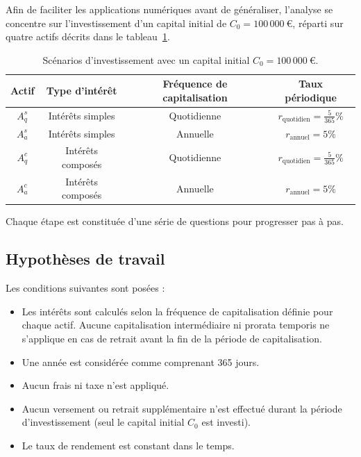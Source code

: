 \documentclass{article}
\begin{document}
Afin de faciliter les applications numériques avant de généraliser, l'analyse se concentre sur l'investissement d'un capital initial de \( C_0 = 100\,000\ \text{€} \), réparti sur quatre actifs décrits dans le tableau~\ref{tab:scenarios}.

\begin{table}[h!]
    \centering
    \begin{tabular}{|c|c|c|c|}
        \hline
        \textbf{Actif} & \textbf{Type d'intérêt} & \textbf{Fréquence de capitalisation} & \textbf{Taux périodique}                \\
        \hline
        \(A_q^s\)      & Intérêts simples        & Quotidienne                           & \(r_\text{quotidien} = \frac{5}{365}\%\) \\
        \hline
        \(A_a^s\)      & Intérêts simples        & Annuelle                              & \(r_\text{annuel} = 5\%\)                \\
        \hline
        \(A_q^c\)      & Intérêts composés      & Quotidienne                           & \(r_\text{quotidien} = \frac{5}{365}\%\) \\
        \hline
        \(A_a^c\)      & Intérêts composés      & Annuelle                              & \(r_\text{annuel} = 5\%\)                \\
        \hline
    \end{tabular}
    \caption{Scénarios d'investissement avec un capital initial \(C_0 = 100\,000\ \text{€}\).}
    \label{tab:scenarios}
\end{table}

Chaque étape est constituée d'une série de questions pour progresser pas à pas.

\subsection{Hypothèses de travail}
Les conditions suivantes sont posées :
\begin{itemize}
    \item Les intérêts sont calculés selon la fréquence de capitalisation définie pour chaque actif. Aucune capitalisation intermédiaire ni prorata temporis ne s'applique en cas de retrait avant la fin de la période de capitalisation.
    \item Une année est considérée comme comprenant 365 jours.
    \item Aucun frais ni taxe n'est appliqué.
    \item Aucun versement ou retrait supplémentaire n’est effectué durant la période d'investissement (seul le capital initial \( C_0 \) est investi).
    \item Le taux de rendement est constant dans le temps.
\end{itemize}
\end{document}
